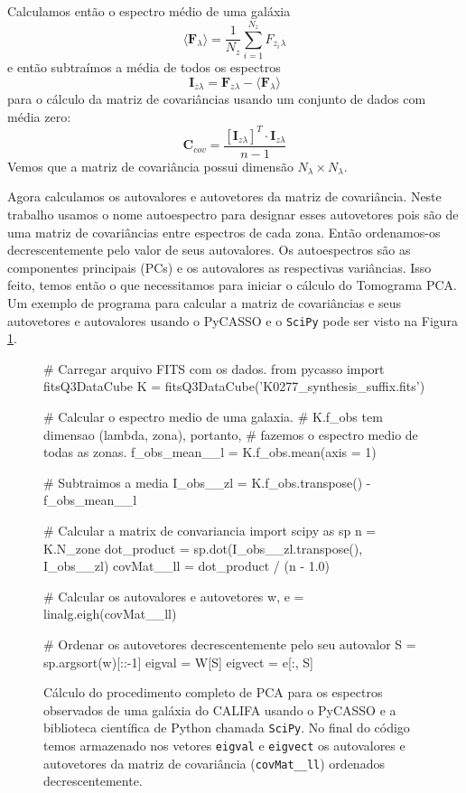 Calculamos então o espectro médio de uma galáxia
\begin{equation}
\langle \textbf{F}{}_\lambda \rangle = \frac{1}{N_z} \sum_{i=1}^{N_z} F_{z_i}{}_{\lambda}
\end{equation}
\noindent e então subtraímos a média de todos os espectros
\begin{equation}
\textbf{I}{}_{z \lambda} = \textbf{F}{}_{z \lambda} - \langle \textbf{F}{}_\lambda \rangle
\end{equation}
\noindent para o cálculo da matriz de covariâncias usando um conjunto de dados com média zero:
\begin{equation}
	\label{eq:PCA:covMatrix}
	\mathbf{C}{}_{cov} = \frac{[\mathbf{I}{}_{z \lambda}]^T \cdot \mathbf{I}{}_{z \lambda}}{n - 1}
\end{equation}
\noindent Vemos que a matriz de covariância possui dimensão $N_\lambda \times N_\lambda$.

Agora calculamos os autovalores e autovetores da matriz de covariância. Neste trabalho usamos o nome autoespectro para
designar esses autovetores pois são de uma matriz de covariâncias entre espectros de cada zona. Então ordenamos-os
decrescentemente pelo valor de seus autovalores. Os autoespectros são as componentes principais (PCs) e os autovalores
as respectivas variâncias. Isso feito, temos então o que necessitamos para iniciar o cálculo do Tomograma PCA. Um
exemplo de programa para calcular a matriz de covariâncias e seus autovetores e autovalores usando o PyCASSO e o
\texttt{SciPy} pode ser visto na Figura \ref{fig:programaCovMatrix}.

\begin{figure}
\begin{python}
# Carregar arquivo FITS com os dados.
from pycasso import fitsQ3DataCube
K = fitsQ3DataCube('K0277_synthesis_suffix.fits')

# Calcular o espectro medio de uma galaxia. 
# K.f_obs tem dimensao (lambda, zona), portanto, 
# fazemos o espectro medio de todas as zonas.
f_obs_mean__l = K.f_obs.mean(axis = 1)

# Subtraimos a media
I_obs__zl = K.f_obs.transpose() - f_obs_mean__l

# Calcular a matrix de convariancia
import scipy as sp
n = K.N_zone
dot_product = sp.dot(I_obs__zl.transpose(), I_obs__zl)
covMat__ll = dot_product / (n - 1.0)   

# Calcular os autovalores e autovetores
w, e = linalg.eigh(covMat__ll)

# Ordenar os autovetores decrescentemente pelo seu autovalor
S = sp.argsort(w)[::-1]
eigval = W[S]
eigvect = e[:, S]
 
\end{python}
	\caption[Exemplo de cálculo de PCA usando o PyCASSO e SciPy.] 
	{Cálculo do procedimento completo de PCA para os espectros observados de uma galáxia do CALIFA usando o PyCASSO e a
	biblioteca científica de Python chamada \texttt{SciPy}. No final do código temos armazenado nos vetores \texttt{eigval}
	e \texttt{eigvect} os autovalores e autovetores da matriz de covariância (\texttt{covMat\_\_ll}) ordenados
	decrescentemente.}
	\label{fig:programaCovMatrix}
\end{figure}

